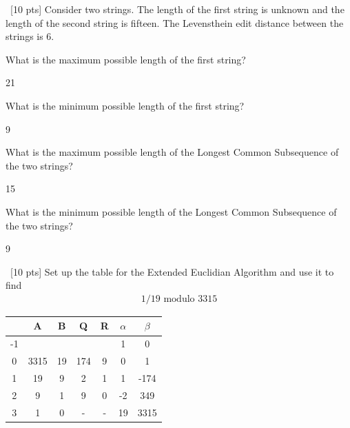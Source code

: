\documentclass[12pt]{article}
\newenvironment{sol}[1][Solution]{\begin{trivlist}\item[\hskip\labelsep {\bfseries #1:}]}{\end{trivlist}}
\begin{document}
\begin{enumerate}
\begin{sol}
    \end{sol}


    \item \ [10 pts] Consider two strings. The length of the first string is unknown and the length of the second string is fifteen. The Levensthein edit distance between the strings is 6.
    \begin{enumerate}
        \item [a.] What is the maximum possible length of the first string?
        \begin{sol}
        21
        \end{sol}
        \item [b.] What is the minimum possible length of the first string?
        \begin{sol}
        9
        \end{sol}
        \item [c.] What is the maximum possible length of the Longest Common Subsequence of the two strings?
        \begin{sol}
            15
        \end{sol}
        \item [d.] What is the minimum possible length of the Longest Common Subsequence of the two strings?
        \begin{sol}
            9
        \end{sol}
        
    \end{enumerate}
    
    \item \ [10 pts] Set up the table for the Extended Euclidian Algorithm and use it to find
    \begin{align*}
        1/19 \text{ modulo } 3315
    \end{align*}
    \begin{sol}
    \hspace*{\fill}
    \begin{center}
        \begin{tabular}{|c|c|c|c|c|c|c|}
        \hline
          & A & B & Q & R & $\alpha$ & $\beta$ \\
          \hline
        -1&   &   &   &   & 1 & 0\\   
        \hline
               0&   3315 &  19 & 174  &  9 &  0 & 1 \\   
        \hline
               1& 19  & 9  &  2 &  1 & 1 & -174\\   
        \hline
               2& 9  &  1 &  9 &   0 & -2 & 349\\   
        \hline
               3&  1 &  0 &  - & -  &  19& 3315 \\   
        \hline


\end{tabular}
\end{center}
\end{sol}
\end{enumerate}
\end{document}
